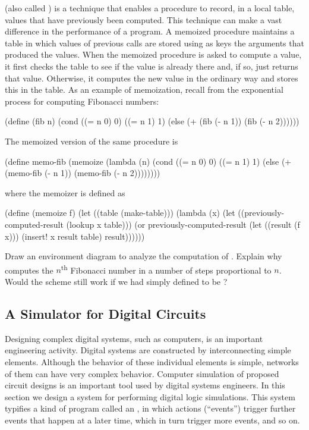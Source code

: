 \begin{exercise}
	\label{Exercise 3.27}
	 (also called ) is a technique that enables a procedure to record, in a local table, values that have previously been computed.
	This technique can make a vast difference in the performance of a program.
	A memoized procedure maintains a table in which values of previous calls are stored using as keys the arguments that produced the values.
	When the memoized procedure is asked to compute a value, it first checks the table to see if the value is already there and, if so, just returns that value.
	Otherwise, it computes the new value in the ordinary way and stores this in the table.
	As an example of memoization, recall from  the exponential process for computing Fibonacci numbers:
	\begin{scheme}
	  (define (fib n)
	    (cond ((= n 0) 0)
	          ((= n 1) 1)
	          (else (+ (fib (- n 1)) (fib (- n 2))))))
	\end{scheme}
	The memoized version of the same procedure is
	\begin{scheme}
	  (define memo-fib
	    (memoize
	     (lambda (n)
	       (cond ((= n 0) 0)
	             ((= n 1) 1)
	             (else (+ (memo-fib (- n 1))
	                      (memo-fib (- n 2))))))))
	\end{scheme}
	where the memoizer is defined as
	\begin{scheme}
	  (define (memoize f)
	    (let ((table (make-table)))
	      (lambda (x)
	        (let ((previously-computed-result
	               (lookup x table)))
	          (or previously-computed-result
	              (let ((result (f x)))
	                (insert! x result table)
	                result))))))
	\end{scheme}
	Draw an environment diagram to analyze the computation of .
	Explain why  computes the \( n \)\textsuperscript{th} Fibonacci number in a number of steps proportional to \( n \).
	Would the scheme still work if we had simply defined  to be ?
\end{exercise}



\subsection{A Simulator for Digital Circuits}
\label{Section 3.3.4}

Designing complex digital systems, such as computers, is an important engineering activity.
Digital systems are constructed by interconnecting simple elements.
Although the behavior of these individual elements is simple, networks of them can have very complex behavior.
Computer simulation of proposed circuit designs is an important tool used by digital systems engineers.
In this section we design a system for performing digital logic simulations.
This system typifies a kind of program called an , in which actions (“events”) trigger further events that happen at a later time, which in turn trigger more events, and so on.

